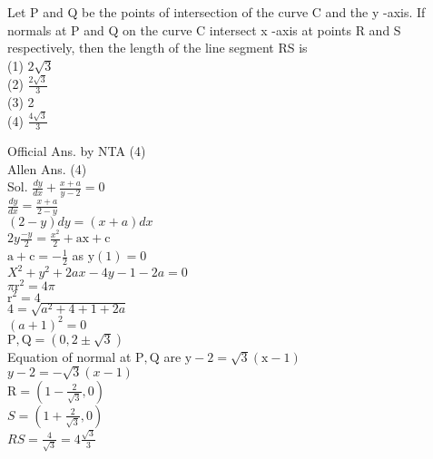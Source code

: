 \documentclass[10pt]{article}
\begin{document}
Let P and Q be the points of intersection of the curve C and the y -axis. If normals at P and Q on the curve C intersect x -axis at points R and S respectively, then the length of the line segment RS is\\
(1) \(2 \sqrt{3}\)\\
(2) \(\frac{2 \sqrt{3}}{3}\)\\
(3) 2\\
(4) \(\frac{4 \sqrt{3}}{3}\)

Official Ans. by NTA (4)\\
Allen Ans. (4)\\
Sol. \(\frac{d y}{d x}+\frac{x+a}{y-2}=0\)\\
\(\frac{d y}{d x}=\frac{x+a}{2-y}\)\\
\((2-y) d y=(x+a) d x\)\\
\(2 y \frac{-y}{2}=\frac{x^{2}}{2}+\mathrm{ax}+\mathrm{c}\)\\
\(\mathrm{a}+\mathrm{c}=-\frac{1}{2}\) as \(\mathrm{y}(1)=0\)\\
\(X^{2}+y^{2}+2 a x-4 y-1-2 a=0\)\\
\(\pi \mathrm{r}^{2}=4 \pi\)\\
\(\mathrm{r}^{2}=4\)\\
\(4=\sqrt{a^{2}+4+1+2 a}\)\\
\((a+1)^{2}=0\)\\
\(\mathrm{P}, \mathrm{Q}=(0,2 \pm \sqrt{3})\)\\
Equation of normal at \(\mathrm{P}, \mathrm{Q}\) are \(\mathrm{y}-2=\sqrt{3}(\mathrm{x}-1)\)\\
\(y-2=-\sqrt{3}(x-1)\)\\
\(\mathrm{R}=\left(1-\frac{2}{\sqrt{3}}, 0\right)\)\\
\(S=\left(1+\frac{2}{\sqrt{3}}, 0\right)\)\\
\(R S=\frac{4}{\sqrt{3}}=4 \frac{\sqrt{3}}{3}\)
\end{document}
